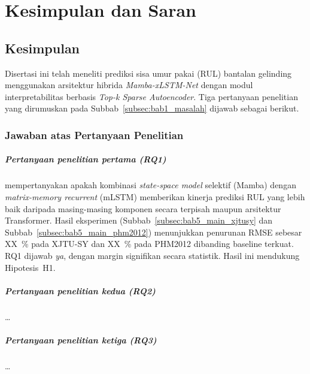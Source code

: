 
\chapter{Kesimpulan dan Saran}
\label{bab:kesimpulan}

\section{Kesimpulan}
\label{sec:bab6_kesimpulan}

Disertasi ini telah meneliti prediksi sisa umur pakai (RUL) bantalan
gelinding menggunakan arsitektur hibrida \emph{Mamba-xLSTM-Net} dengan
modul interpretabilitas berbasis \emph{Top-k Sparse Autoencoder}. Tiga
pertanyaan penelitian yang dirumuskan pada
Subbab~\ref{subsec:bab1_masalah} dijawab sebagai berikut.

\subsection{Jawaban atas Pertanyaan Penelitian}
\label{subsec:bab6_jawaban_rq}

\paragraph{Pertanyaan penelitian pertama (RQ1)}
mempertanyakan apakah kombinasi \emph{state-space model} selektif
(Mamba) dengan \emph{matrix-memory recurrent} (mLSTM) memberikan
kinerja prediksi RUL yang lebih baik daripada masing-masing komponen
secara terpisah maupun arsitektur Transformer. Hasil eksperimen
(Subbab~\ref{subsec:bab5_main_xjtusy} dan
Subbab~\ref{subsec:bab5_main_phm2012}) menunjukkan penurunan RMSE
sebesar XX~\% pada XJTU-SY dan XX~\% pada PHM2012 dibanding baseline
terkuat. RQ1 dijawab \emph{ya}, dengan margin signifikan secara
statistik. Hasil ini mendukung Hipotesis~H1.

\paragraph{Pertanyaan penelitian kedua (RQ2)}
\dots

\paragraph{Pertanyaan penelitian ketiga (RQ3)}
\dots

